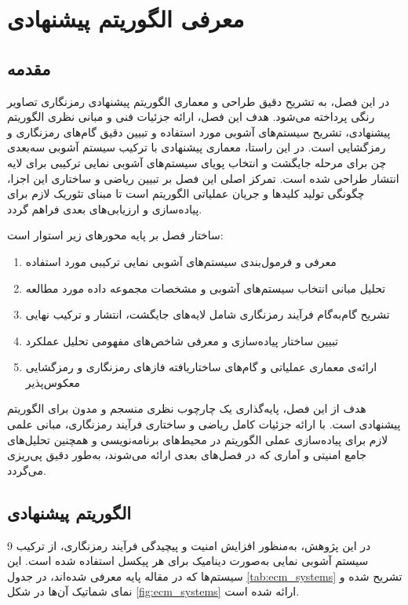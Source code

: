 \documentclass[a4paper,12pt]{report}
\renewcommand{\%}{\lr{\oldpercent}}
\begin{document}
\newpage

\chapter{معرفی الگوریتم پیشنهادی}

\section{مقدمه}
در این فصل، به تشریح دقیق طراحی و معماری الگوریتم پیشنهادی رمزنگاری تصاویر رنگی پرداخته می‌شود. هدف این فصل، ارائه جزئیات فنی و مبانی نظری الگوریتم پیشنهادی، تشریح سیستم‌های آشوبی مورد استفاده و تبیین دقیق گام‌های رمزنگاری و رمزگشایی است. در این راستا، معماری پیشنهادی با ترکیب سیستم آشوبی سه‌بعدی چن برای مرحله جایگشت و انتخاب پویای سیستم‌های آشوبی نمایی ترکیبی برای لایه انتشار طراحی شده است. تمرکز اصلی این فصل بر تبیین ریاضی و ساختاری این اجزا، چگونگی تولید کلیدها و جریان عملیاتی الگوریتم است تا مبنای تئوریک لازم برای پیاده‌سازی و ارزیابی‌های بعدی فراهم گردد.

ساختار فصل بر پایه محورهای زیر استوار است:
\begin{enumerate}
    \item معرفی و فرمول‌بندی سیستم‌های آشوبی نمایی ترکیبی مورد استفاده
    \item تحلیل مبانی انتخاب سیستم‌های آشوبی و مشخصات مجموعه داده مورد مطالعه
    \item تشریح گام‌به‌گام فرآیند رمزنگاری شامل لایه‌های جایگشت، انتشار و ترکیب نهایی
    \item تبیین ساختار پیاده‌سازی و معرفی شاخص‌های مفهومی تحلیل عملکرد
    \item ارائه‌ی معماری عملیاتی و گام‌های ساختاریافته فازهای رمزنگاری و رمزگشایی معکوس‌پذیر
\end{enumerate}

هدف از این فصل، پایه‌گذاری یک چارچوب نظری منسجم و مدون برای الگوریتم پیشنهادی است. با ارائه جزئیات کامل ریاضی و ساختاری فرآیند رمزنگاری، مبانی علمی لازم برای پیاده‌سازی عملی الگوریتم در محیط‌های برنامه‌نویسی و همچنین تحلیل‌های جامع امنیتی و آماری که در فصل‌های بعدی ارائه می‌شوند، به‌طور دقیق پی‌ریزی می‌گردد.

\section{الگوریتم پیشنهادی}
در این پژوهش، به‌منظور افزایش امنیت و پیچیدگی فرآیند رمزنگاری، از ترکیب 9 سیستم آشوبی نمایی به‌صورت دینامیک برای هر پیکسل استفاده شده است. این سیستم‌ها که در مقاله پایه \cite{ref4} معرفی شده‌اند، در جدول \ref{tab:ecm_systems} تشریح شده و نمای شماتیک آن‌ها در شکل \ref{fig:ecm_systems} ارائه شده است.
\end{document}
